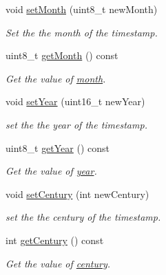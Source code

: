 \begin{DoxyCompactItemize}
void \mbox{\hyperlink{classtimestamp_ac95d923ad675c4a2bff8b4b0384b6222}{set\+Month}} (uint8\+\_\+t new\+Month)
\begin{DoxyCompactList}\small\item\em Set the the month of the timestamp. \end{DoxyCompactList}\item 
uint8\+\_\+t \mbox{\hyperlink{classtimestamp_a7225435b1a1ee20ae0dd8708f8e68ee8}{get\+Month}} () const
\begin{DoxyCompactList}\small\item\em Get the value of \mbox{\hyperlink{classtimestamp_a71df69b7ebb5a6dd228f4ae70b954505}{month}}. \end{DoxyCompactList}\item 
void \mbox{\hyperlink{classtimestamp_a2ad3d28f226c8f2ed74c06c609e29aff}{set\+Year}} (uint16\+\_\+t new\+Year)
\begin{DoxyCompactList}\small\item\em set the the year of the timestamp. \end{DoxyCompactList}\item 
uint8\+\_\+t \mbox{\hyperlink{classtimestamp_a21c6dd709bb29c95cea2641f26c6c088}{get\+Year}} () const
\begin{DoxyCompactList}\small\item\em Get the value of \mbox{\hyperlink{classtimestamp_a6df342bdd1101cf67f9a4831d5372d58}{year}}. \end{DoxyCompactList}\item 
void \mbox{\hyperlink{classtimestamp_ad7c219bebf2b101f13f0a48e435ad888}{set\+Century}} (int new\+Century)
\begin{DoxyCompactList}\small\item\em set the the century of the timestamp. \end{DoxyCompactList}\item 
int \mbox{\hyperlink{classtimestamp_a91ed1d395dd3d230607c4cb936b6004a}{get\+Century}} () const
\begin{DoxyCompactList}\small\item\em Get the value of \mbox{\hyperlink{classtimestamp_afe83888ffa38c1615a3d12b012f235b3}{century}}. \end{DoxyCompactList}\end{DoxyCompactItemize}
